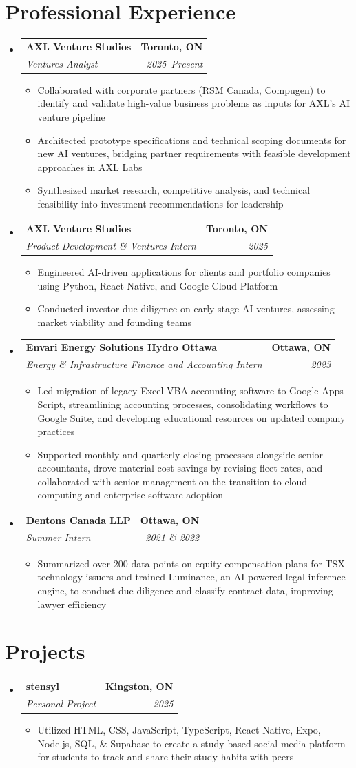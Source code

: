 \documentclass[letterpaper,10pt]{article}
\makeatletter
\newcommand{\resumeItem}[1]{
  \item\small{
    {#1 \vspace{-2pt}}
  }
}
\newcommand{\resumeSubheading}[4]{
  \vspace{-2pt}\item
    \begin{tabular*}{1.0\textwidth}[t]{l@{\extracolsep{\fill}}r}
      \textbf{#1} & \textbf{\small #2} \\
      \textit{\small#3} & \textit{\small #4} \\
    \end{tabular*}\vspace{-7pt}
}
\newcommand{\resumeSubHeadingListStart}{\begin{itemize}[leftmargin=0.0in, label={}]}
\newcommand{\resumeSubHeadingListEnd}{\end{itemize}}
\newcommand{\resumeItemListStart}{\begin{itemize}[label=--]}
\newcommand{\resumeItemListEnd}{\end{itemize}\vspace{-5pt}}
\makeatother
\begin{document}
\section{Professional Experience}
  \resumeSubHeadingListStart
    \resumeSubheading
      {AXL Venture Studios}{Toronto, ON}
      {Ventures Analyst}{2025--Present}
      \resumeItemListStart
        \resumeItem{Collaborated with corporate partners (RSM Canada, Compugen) to identify and validate high-value business problems as inputs for AXL's AI venture pipeline}
        \resumeItem{Architected prototype specifications and technical scoping documents for new AI ventures, bridging partner requirements with feasible development approaches in AXL Labs}
        \resumeItem{Synthesized market research, competitive analysis, and technical feasibility into investment recommendations for leadership}
      \resumeItemListEnd
    \resumeSubheading
      {AXL Venture Studios}{Toronto, ON}
      {Product Development \& Ventures Intern}{2025}
      \resumeItemListStart
        \resumeItem{Engineered AI-driven applications for clients and portfolio companies using Python, React Native, and Google Cloud Platform}
        \resumeItem{Conducted investor due diligence on early-stage AI ventures, assessing market viability and founding teams}
      \resumeItemListEnd
    \resumeSubheading
      {Envari Energy Solutions \textbar{} Hydro Ottawa}{Ottawa, ON}
      {Energy \& Infrastructure Finance and Accounting Intern}{2023}
      \resumeItemListStart
        \resumeItem{Led migration of legacy Excel VBA accounting software to Google Apps Script, streamlining accounting processes, consolidating workflows to Google Suite, and developing educational resources on updated company practices}
        \resumeItem{Supported monthly and quarterly closing processes alongside senior accountants, drove material cost savings by revising fleet rates, and collaborated with senior management on the transition to cloud computing and enterprise software adoption}
      \resumeItemListEnd
    \resumeSubheading
      {Dentons Canada LLP}{Ottawa, ON}
      {Summer Intern}{2021 \& 2022}
      \resumeItemListStart
        \resumeItem{Summarized over 200 data points on equity compensation plans for TSX technology issuers and trained Luminance, an AI-powered legal inference engine, to conduct due diligence and classify contract data, improving lawyer efficiency}
      \resumeItemListEnd
  \resumeSubHeadingListEnd

\section{Projects}
    \resumeSubHeadingListStart
      \resumeSubheading
          {stensyl}{Kingston, ON}
          {Personal Project}{2025}
          \resumeItemListStart
            \resumeItem{Utilized HTML, CSS, JavaScript, TypeScript, React Native, Expo, Node.js, SQL, \& Supabase to create a study-based social media platform for students to track and share their study habits with peers}
          \resumeItemListEnd
    \resumeSubHeadingListEnd
\end{document}
